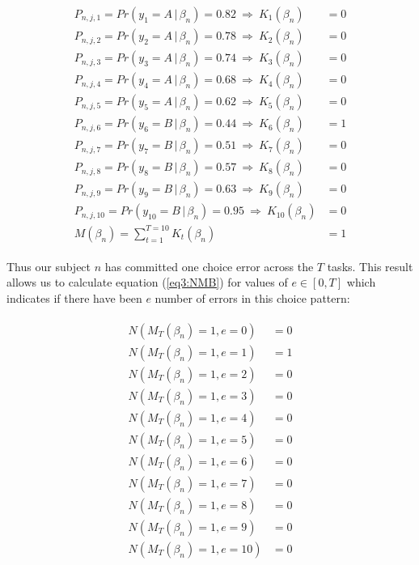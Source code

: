 \documentclass[../main.tex]{subfiles}
\begin{document}
\begin{align}
	\label{eq3:example_MTBn}
	\begin{split}
		P_{n,j,1}  = Pr(y_1 = A    \,|\, \beta_n) = 0.82 ~ \Rightarrow ~ K_{1}(\beta_n)  &= 0 \\
		P_{n,j,2}  = Pr(y_2 = A    \,|\, \beta_n) = 0.78 ~ \Rightarrow ~ K_{2}(\beta_n)  &= 0 \\
		P_{n,j,3}  = Pr(y_3 = A    \,|\, \beta_n) = 0.74 ~ \Rightarrow ~ K_{3}(\beta_n)  &= 0 \\
		P_{n,j,4}  = Pr(y_4 = A    \,|\, \beta_n) = 0.68 ~ \Rightarrow ~ K_{4}(\beta_n)  &= 0 \\
		P_{n,j,5}  = Pr(y_5 = A    \,|\, \beta_n) = 0.62 ~ \Rightarrow ~ K_{5}(\beta_n)  &= 0 \\
		P_{n,j,6}  = Pr(y_6 = B    \,|\, \beta_n) = 0.44 ~ \Rightarrow ~ K_{6}(\beta_n)  &= 1 \\
		P_{n,j,7}  = Pr(y_7 = B    \,|\, \beta_n) = 0.51 ~ \Rightarrow ~ K_{7}(\beta_n)  &= 0 \\
		P_{n,j,8}  = Pr(y_8 = B    \,|\, \beta_n) = 0.57 ~ \Rightarrow ~ K_{8}(\beta_n)  &= 0 \\
		P_{n,j,9}  = Pr(y_9 = B    \,|\, \beta_n) = 0.63 ~ \Rightarrow ~ K_{9}(\beta_n)  &= 0 \\
		P_{n,j,10} = Pr(y_{10} = B \,|\, \beta_n) = 0.95 ~ \Rightarrow ~ K_{10}(\beta_n) &= 0 \\
		                                M(\beta_n) = \sum_{t = 1}^{T = 10}{K_t(\beta_n)} &= 1
	\end{split}
\end{align}

\noindent Thus our subject $n$ has committed one choice error across the $T$ tasks.
This result allows us to calculate equation (\ref{eq3:NMB}) for values of $e \in [ 0, T ]$ which indicates if there have been $e$ number of errors in this choice pattern:

\begin{align}
	\label{eq3:example_NMB}
	\begin{split}
		N( M_T(\beta_n) = 1, e = 0 )  &= 0 \\
		N( M_T(\beta_n) = 1, e = 1 )  &= 1 \\
		N( M_T(\beta_n) = 1, e = 2 )  &= 0 \\
		N( M_T(\beta_n) = 1, e = 3 )  &= 0 \\
		N( M_T(\beta_n) = 1, e = 4 )  &= 0 \\
		N( M_T(\beta_n) = 1, e = 5 )  &= 0 \\
		N( M_T(\beta_n) = 1, e = 6 )  &= 0 \\
		N( M_T(\beta_n) = 1, e = 7 )  &= 0 \\
		N( M_T(\beta_n) = 1, e = 8 )  &= 0 \\
		N( M_T(\beta_n) = 1, e = 9 )  &= 0 \\
		N( M_T(\beta_n) = 1, e = 10 ) &= 0 \\
	\end{split}
\end{align}
\end{document}

